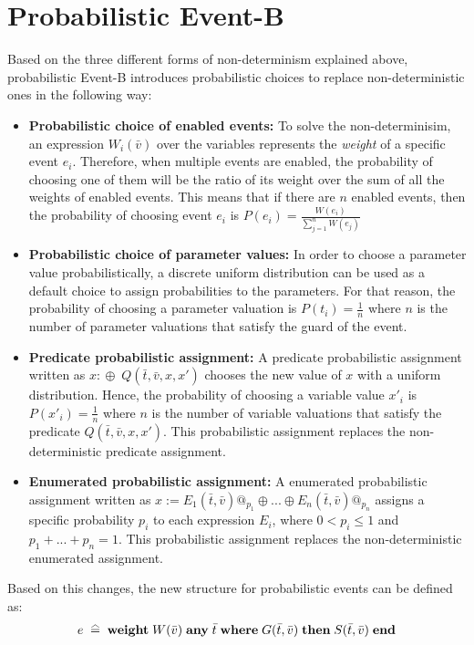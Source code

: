 \section{Probabilistic Event-B}
Based on the three different forms of non-determinism explained above, probabilistic Event-B \cite{Aouadhi2017} introduces probabilistic choices to replace non-deterministic ones in the following way:
\begin{itemize}
    \item \textbf{Probabilistic choice of enabled events:} To solve the non-determinisim, an expression $W_i(\bar{v})$ over the variables represents the \textit{weight} of a specific event $e_i$. Therefore, when multiple events are enabled, the probability of choosing one of them will be the ratio of its weight over the sum of all the weights of enabled events. This means that if there are $n$ enabled events, then the probability of choosing event $e_i$ is $P(e_i) = \frac{W(e_i)}{\sum^{n}_{j = 1}W(e_j)}$
    \item \textbf{Probabilistic choice of parameter values:} In order to choose a parameter value probabilistically, a discrete uniform distribution can be used as a default choice to assign probabilities to the parameters. For that reason, the probability of choosing a parameter valuation is $P(t_i) = \frac{1}{n}$ where $n$ is the number of parameter valuations that satisfy the guard of the event.
    \item \textbf{Predicate probabilistic assignment:} A predicate probabilistic assignment written as $x:\! \oplus \; Q(\bar{t}, \bar{v}, x, x')$ chooses the new value of $x$ with a uniform distribution. Hence, the probability of choosing a variable value $x'_i$ is $P(x'_i) = \frac{1}{n}$ where $n$ is the number of variable valuations that satisfy the predicate $Q(\bar{t}, \bar{v}, x, x')$. This probabilistic assignment replaces the non-deterministic predicate assignment. 
    \item \textbf{Enumerated probabilistic assignment:} A enumerated probabilistic assignment written as $x := E_1(\bar{t},\bar{v})@_{p_1}\oplus...\oplus E_n(\bar{t},\bar{v})@_{p_n}$  assigns a specific probability $p_i$ to each expression $E_i$, where $0 < p_i \leq 1$ and $p_1 + ... + p_n = 1$. This probabilistic assignment replaces the non-deterministic enumerated assignment.
\end{itemize}
Based on this changes, the new structure for probabilistic events can be defined as:
\begin{align*}
    e \; \equalhat \; \textbf{weight} \; W( \bar{v}) \; \textbf{any} \; \bar{t} \; \textbf{where} \; G(\bar{t}, \bar{v}) \; \textbf{then} \; S(\bar{t}, \bar{v}) \; \textbf{end} 
\end{align*}
